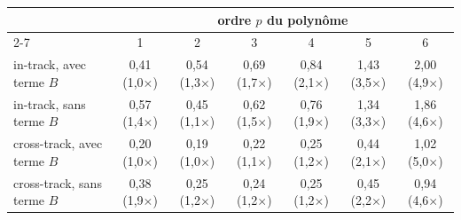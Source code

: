\begin{tabular}{lcccccc}
\toprule
& \multicolumn{6}{c}{ordre $p$ du polynôme} \\
\cmidrule(lr){2-7}
& 1 & 2 & 3 & 4 & 5 & 6 \\
\midrule
in-track, avec terme $B$ & 0,41 (1,0$\times$) & 0,54 (1,3$\times$) & 0,69 (1,7$\times$) & 0,84 (2,1$\times$) & 1,43 (3,5$\times$) & 2,00 (4,9$\times$) \\
in-track, sans terme $B$ & 0,57 (1,4$\times$) & 0,45 (1,1$\times$) & 0,62 (1,5$\times$) & 0,76 (1,9$\times$) & 1,34 (3,3$\times$) & 1,86 (4,6$\times$) \\
\midrule
cross-track, avec terme $B$ & 0,20 (1,0$\times$) & 0,19 (1,0$\times$) & 0,22 (1,1$\times$) & 0,25 (1,2$\times$) & 0,44 (2,1$\times$) & 1,02 (5,0$\times$) \\
cross-track, sans terme $B$ & 0,38 (1,9$\times$) & 0,25 (1,2$\times$) & 0,24 (1,2$\times$) & 0,25 (1,2$\times$) & 0,45 (2,2$\times$) & 0,94 (4,6$\times$) \\
\bottomrule
\end{tabular}
